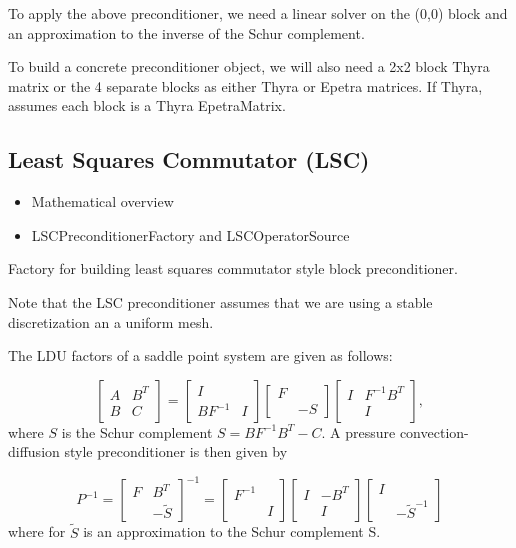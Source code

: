 To apply the above preconditioner, we need a linear solver on the
(0,0) block and an approximation to the inverse of the Schur
complement.

To build a concrete preconditioner object, we will also need a 2x2
block Thyra matrix or the 4 separate blocks as either Thyra or Epetra
matrices.  If Thyra, assumes each block is a Thyra EpetraMatrix.

\subsection{Least Squares Commutator (LSC)}
\begin{itemize}
\item Mathematical overview
\item LSCPreconditionerFactory and LSCOperatorSource
\end{itemize}


Factory for building least squares commutator style block
preconditioner.  

Note that the LSC preconditioner assumes that we are using
a stable discretization an a uniform mesh.

The LDU factors of a saddle point system are given as follows:

\begin{equation}
  \left[ \begin{array}{cc} A & B^T \\ B & C \end{array} \right]
     = \left[ \begin{array}{cc} I & \\ BF^{-1} & I \end{array} \right]
       \left[ \begin{array}{cc} F & \\  & -S \end{array} \right]
       \left[ \begin{array}{cc} I & F^{-1} B^T  \\  & I \end{array} \right],
\end{equation}
where $S$ is the Schur complement $S = B F^{-1} B^T - C$.
A pressure convection-diffusion style preconditioner is then given by
     
\begin{equation}
     P^{-1} =
       \left[ \begin{array}{cc} F & B^T \\ & -\tilde S \end{array} \right]^{-1}
       = 
       \left[ \begin{array}{cc} F^{-1} &  \\  & I \end{array} \right]
       \left[ \begin{array}{cc} I & -B^T \\  & I \end{array} \right]
       \left[ \begin{array}{cc} I &  \\  & -\tilde S^{-1} \end{array} \right]
\end{equation}
where for $\tilde S$ is an approximation to the Schur complement S.

